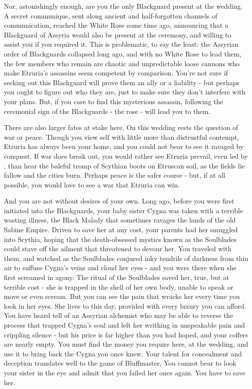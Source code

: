\documentclass[char]{Kos}
\begin{document}
    Nor, astonishingly enough, are you the only Blackguard present at the wedding. A secret communique, sent along ancient and half-forgotten channels of communication, reached the White Rose some time ago, announcing that a Blackguard of Assyria would also be present at the ceremony, and willing to assist you if you required it. This is problematic, to say the least: the Assyrian order of Blackguards collapsed long ago, and with no White Rose to lead them, the few members who remain are chaotic and unpredictable loose cannons who make Etruria's assassins seem competent by comparison. You're not sure if seeking out this Blackguard will prove them an ally or a liability - but perhaps you ought to figure out who they are, just to make sure they don't interfere with your plans. But, if you care to find this mysterious assassin, following the ceremonial sign of the Blackguards - the rose - will lead you to them.

    There are also larger fates at stake here. On this wedding rests the question of war or peace. Though you view \cEtruriaKing{\Monarch} \cEtruriaKing{} \cEtruriaKing{\them}self with little more than distrustful contempt, Etruria has always been your home, and you could not bear to see it ravaged by conquest. If war does break out, you would rather see Etruria prevail, even led by \cEtruriaKing{}, than hear the baleful tromp of Scythian boots on Etruscan soil, as the fields lie fallow and the cities burn. Perhaps peace is the safer course - but, if at all possible, you would love to see a war that Etruria can win. 

    And you are not without desires of your own. Long ago, before you were first initiated into the Blackguards, your baby sister Cygna was taken with a terrible wasting illness, the Black Malady that sometimes ravages the lands of the old Sabine Empire. Driven to save her at any cost, your parents had her smuggled into Scythia, hoping that the death-obsessed mystics known as the Soulblades could stave off the ailment that threatened to devour her. You traveled with them, and watched as the Soulblades conjured inky tendrils of darkness from thin air to suffuse Cygna's veins and cloud her eyes - and you were there when she first screamed in agony. The ritual of the Soulblades saved her, true, but at terrible cost - she is trapped in the shell of her own body, unable to speak or move or even scream. But you can see the pain that wracks her every time you look in her eyes. She lives to this day, provided with every luxury you can afford. You have heard tell of an Assyrian alchemist who may be able to reverse the process that trapped Cygna's soul and left her writhing in unspeakable pain and crippling silence - but his price is far higher than you had hoped, and your coffers are nearly empty. You must find the money you require here, at the wedding, and use it to bring back the Cygna you once knew. Your talent for concealment and deception translates well to the game of Bluffmaster, You cannot bear to look your sister in the eye and admit that you failed her once again. You have to save her.
\end{document}
